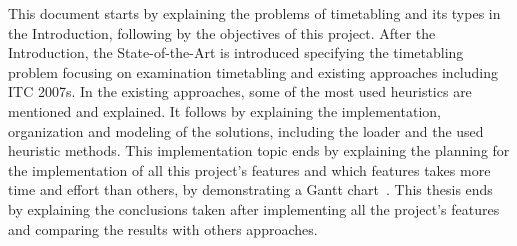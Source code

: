 This document starts by explaining the problems of timetabling and its types in the Introduction, following by the objectives of this project. After the Introduction, the State-of-the-Art is introduced specifying the timetabling problem focusing on examination timetabling and existing approaches including ITC 2007s. In the existing approaches, some of the most used heuristics are mentioned and explained. It follows by explaining the implementation, organization and modeling of the solutions, including the loader and the used heuristic methods. This implementation topic ends by explaining the planning for the implementation of all this project's features and which features takes more time and effort than others, by demonstrating a Gantt chart~\cite{Wilson2003}. This thesis ends by explaining the conclusions taken after implementing all the project's features and comparing the results with others approaches.